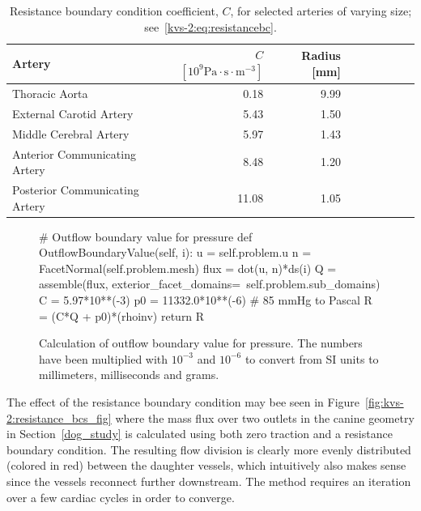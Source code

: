 \begin{table}
  \center
    \begin{tabular}{l*{7}{r}r}
      Artery & $C$ $ [10^9 \mathrm{Pa} \cdot \mathrm{s}  \cdot \mathrm{m}^{-3}]$ & Radius [mm]\\
      \hline
      Thoracic Aorta			&  0.18 &  	9.99\\
      External Carotid Artery  	& 5.43   &	1.50\\
      Middle Cerebral Artery  	& 5.97   &	1.43\\
      Anterior Communicating Artery  	& 8.48   &	1.20\\
      Posterior Communicating Artery  & 11.08   &	1.05\\
    \end{tabular}
  \caption{Resistance boundary condition coefficient, $C$,
    for selected arteries of varying size; see~\eqref{kvs-2:eq:resistancebc}.}
  \label{resistance_coeff}
\end{table}

\begin{figure}
\begin{python}
# Outflow boundary value for pressure
def OutflowBoundaryValue(self, i):
    u = self.problem.u
    n = FacetNormal(self.problem.mesh)
    flux = dot(u, n)*ds(i)
    Q = assemble(flux,
                 exterior_facet_domains=\
                 self.problem.sub_domains)
    C = 5.97*10**(-3)
    p0 = 11332.0*10**(-6) # 85 mmHg to Pascal
    R = (C*Q + p0)*(rhoinv)
    return R
\end{python}
\caption{Calculation of outflow boundary value for pressure. The
numbers have been multiplied with $10^{-3}$
and $10^{-6}$ to convert from SI units to millimeters, milliseconds
and grams.}
\label{fig:kvs-2:resistance_code}
\end{figure}

The effect of the resistance boundary condition may bee seen in
Figure~\ref{fig:kvs-2:resistance_bcs_fig} where the mass flux over two
outlets in the canine geometry in Section~\ref{dog_study} is
calculated using both zero traction and a resistance boundary
condition. The resulting flow division is clearly more evenly
distributed (colored in red) between the daughter vessels, which
intuitively also makes sense since the vessels reconnect further
downstream. The method requires an iteration over a few cardiac cycles
in order to converge.


